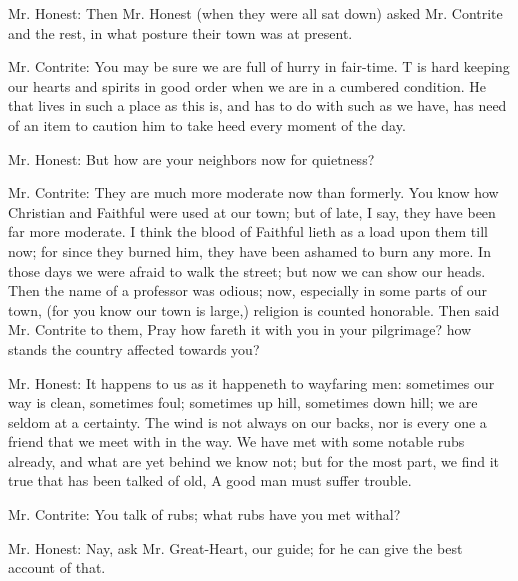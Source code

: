 Mr. Honest: Then Mr. Honest (when they were all sat down) asked Mr. Contrite and the rest, in what posture their town was at present.

Mr. Contrite: You may be sure we are full of hurry in fair-time. T is hard keeping our hearts and spirits in good order when we are in a cumbered condition. He that lives in such a place as this is, and has to do with such as we have, has need of an item to caution him to take heed every moment of the day.

Mr. Honest: But how are your neighbors now for quietness?

Mr. Contrite: They are much more moderate now than formerly. You know how Christian and Faithful were used at our town; but of late, I say, they have been far more moderate. I think the blood of Faithful lieth as a load upon them till now; for since they burned him, they have been ashamed to burn any more. In those days we were afraid to walk the street; but now we can show our heads. Then the name of a professor was odious; now, especially in some parts of our town, (for you know our town is large,) religion is counted honorable. Then said Mr. Contrite to them, Pray how fareth it with you in your pilgrimage? how stands the country affected towards you?

Mr. Honest: It happens to us as it happeneth to wayfaring men: sometimes our way is clean, sometimes foul; sometimes up hill, sometimes down hill; we are seldom at a certainty. The wind is not always on our backs, nor is every one a friend that we meet with in the way. We have met with some notable rubs already, and what are yet behind we know not; but for the most part, we find it true that has been talked of old, A good man must suffer trouble.

Mr. Contrite: You talk of rubs; what rubs have you met withal?

Mr. Honest: Nay, ask Mr. Great-Heart, our guide; for he can give the best account of that.

